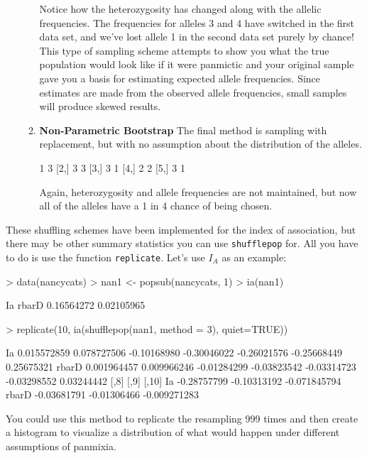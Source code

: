 \documentclass[letterpaper]{article}
\begin{document}
\begin{itemize}
\begin{enumerate}
Notice how the heterozygosity has changed along with the allelic frequencies. The frequencies for alleles 3 and 4 have switched in the first data set, and we've lost allele 1 in the second data set purely by chance! This type of sampling scheme attempts to show you what the true population would look like if it were panmictic and your original sample gave you a basis for estimating expected allele frequencies. Since estimates are made from the observed allele frequencies, small samples will produce skewed results.
    \item \textbf{Non-Parametric Bootstrap} The final method is sampling with replacement, but with no assumption about the distribution of the alleles. 
\begin{Schunk}
\begin{Soutput}
     [,1] [,2]
[1,]    1    3
[2,]    3    3
[3,]    3    1
[4,]    2    2
[5,]    3    1
\end{Soutput}
\end{Schunk}
Again, heterozygosity and allele frequencies are not maintained, but now all of the alleles have a 1 in 4 chance of being chosen.
  \end{enumerate}
\end{itemize}
These shuffling schemes have been implemented for the index of association, but there may be other summary statistics you can use \texttt{shufflepop} for. All you have to do is use the function \texttt{replicate}. Let's use $I_A$ as an example:
\begin{Schunk}
\begin{Sinput}
> data(nancycats)
> nan1 <- popsub(nancycats, 1)
> ia(nan1)
\end{Sinput}
\begin{Soutput}
        Ia      rbarD 
0.16564272 0.02105965 
\end{Soutput}
\begin{Sinput}
> replicate(10, ia(shufflepop(nan1, method = 3), quiet=TRUE))
\end{Sinput}
\begin{Soutput}
             [,1]        [,2]        [,3]        [,4]        [,5]        [,6]       [,7]
Ia    0.015572859 0.078727506 -0.10168980 -0.30046022 -0.26021576 -0.25668449 0.25675321
rbarD 0.001964457 0.009966246 -0.01284299 -0.03823542 -0.03314723 -0.03298552 0.03244442
             [,8]        [,9]        [,10]
Ia    -0.28757799 -0.10313192 -0.071845794
rbarD -0.03681791 -0.01306466 -0.009271283
\end{Soutput}
\end{Schunk}
You could use this method to replicate the resampling 999 times and then create a histogram to visualize a distribution of what would happen under different assumptions of panmixia.
\end{document}
